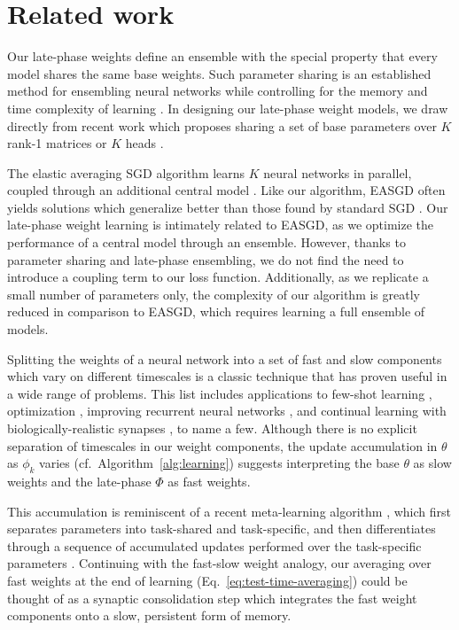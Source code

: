 \documentclass{article} \usepackage{iclr2021_conference,times}
\begin{document}
\section{Related work}
Our late-phase weights define an ensemble with the special property that every model shares the same base weights. Such parameter sharing is an established method for ensembling neural networks while controlling for the memory and time complexity of learning \citep{lee_why_2015}. In designing our late-phase weight models, we draw directly from recent work which proposes sharing a set of base parameters over $K$ rank-1 matrices \citep{wen_batchensemble_2020} or $K$ heads \citep{lee_why_2015}.


The elastic averaging SGD algorithm learns $K$ neural networks in parallel, coupled through an additional central model \citep[EASGD;][]{zhang_deep_2015}. Like our algorithm, EASGD often yields solutions which generalize better than those found by standard SGD \citep{pittorino_entropic_2020}. Our late-phase weight learning is intimately related to EASGD, as we optimize the performance of a central model through an ensemble. However, thanks to parameter sharing and late-phase ensembling, we do not find the need to introduce a coupling term to our loss function. Additionally, as we replicate a small number of parameters only, the complexity of our algorithm is greatly reduced in comparison to EASGD, which requires learning a full ensemble of models.


Splitting the weights of a neural network into a set of fast and slow components which vary on different timescales is a classic technique \citep{hinton_using_1987,schmidhuber_learning_1992} that has proven useful in a wide range of problems. This list includes applications to few-shot learning \citep{munkhdalai_meta_2017,nichol_first-order_2018,perez_film_2018,zintgraf_fast_2019,flennerhag_meta-learning_2020}, optimization \citep{zhang_lookahead_2019,chaudhari_entropy-sgd_2019}, improving recurrent neural networks \citep{ba_using_2016,ha_hypernetworks_2017}, and continual learning with biologically-realistic synapses \citep{kaplanis_continual_2018,leimer_synaptic_2019}, to name a few. Although there is no explicit separation of timescales in our weight components, the update accumulation in $\theta$ as $\phi_k$ varies (cf.~Algorithm~\ref{alg:learning}) suggests interpreting the base $\theta$ as slow weights and the late-phase $\Phi$ as fast weights. 

This accumulation is reminiscent of a recent meta-learning algorithm \citep{zintgraf_fast_2019}, which first separates parameters into task-shared and task-specific, and then differentiates through a sequence of accumulated updates performed over the task-specific parameters \citep{finn_model-agnostic_2017}. Continuing with the fast-slow weight analogy, our averaging over fast weights at the end of learning (Eq.~\ref{eq:test-time-averaging}) could be thought of as a synaptic consolidation step which integrates the fast weight components onto a slow, persistent form of memory.
\end{document}

